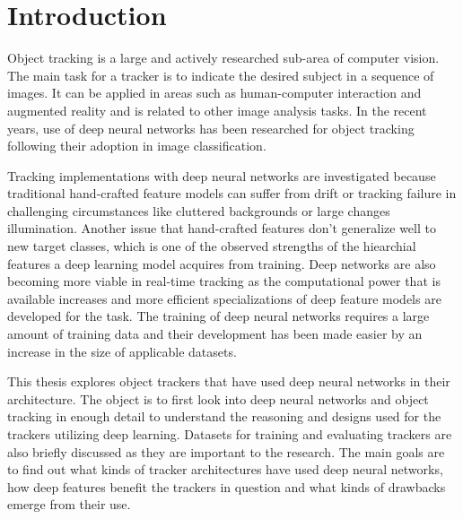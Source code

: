\section{Introduction}
Object tracking is a large and actively researched sub-area of computer vision. The
main task for a tracker is to indicate the desired subject in a sequence of images.
It can be applied in areas such as human-computer interaction and augmented reality
and is related to other image analysis tasks. In the recent years, use of deep neural
networks has been researched for object tracking following their adoption in image
classification.

Tracking implementations with deep neural networks are investigated because traditional
hand-crafted feature models can suffer from drift or tracking failure in challenging
circumstances like cluttered backgrounds or large changes illumination. Another issue
that hand-crafted features don't generalize well to new target classes, which is one
of the observed strengths of the hiearchial features a deep learning model acquires
from training. Deep networks are also becoming more viable in real-time tracking as
the computational power that is available increases and more efficient specializations
of deep feature models are developed for the task. The training of deep neural networks
requires a large amount of training data and their development has been made easier by
an increase in the size of applicable datasets.

This thesis explores object trackers that have used deep neural networks in their
architecture. The object is to first look into deep neural networks and object tracking
in enough detail to understand the reasoning and designs used for the trackers utilizing
deep learning. Datasets for training and evaluating trackers are also briefly discussed
as they are important to the research. The main goals are to find out what kinds of
tracker architectures have used deep neural networks, how deep features benefit the
trackers in question and what kinds of drawbacks emerge from their use.

